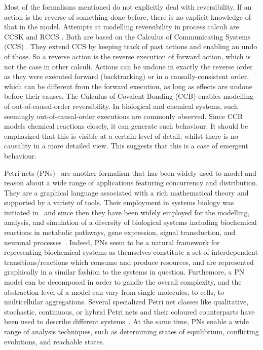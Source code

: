 \documentclass[runningheads]{llncs}
\begin{document}
Most of the formalisms mentioned do not explicitly deal with reversibility. If an action is the reverse of something done before, there is no explicit knowledge of that in the model. Attempts at modelling reversibility in process calculi are CCSK \cite{Irek2007} and RCCS \cite{danos2004ccsr}. Both are based on the Calculus of Communicating Systems (CCS) \cite{MilnerBook}. They extend CCS by keeping track of past actions and enabling an undo of those. So a reverse action is the reverse execution of forward action, which is not the case in other calculi. Actions can be undone in exactly the reverse order as they were executed forward (backtracking) or in a causally-consistent order, which can be different from the forward execution, as long as effects are undone before their causes. The Calculus of Covalent Bonding (CCB) \cite{KUHN201818} enables modelling of out-of-causal-order reversibility. In biological and chemical systems, such seemingly out-of-causal-order executions are commonly observed. Since CCB models chemical reactions closely, it can generate such behaviour. It should be emphasized that this is visible at a certain level of detail, whilst there is no causality in a more detailed view. This suggests that this is a case of emergent behaviour.

Petri nets (PNs)~\cite{PNs} are another formalism that has been widely used to model and reason
about a wide range of applications featuring concurrency and distribution. They are a graphical 
language  associated with 
a rich mathematical theory and supported by a variety of tools. Their employment in systems 
biology was initiated in~\cite{DBLP:conf/ismb/ReddyML93,DBLP:journals/jsamas/HofestadtH94}
and since then they have been widely employed for
the modelling, analysis, and simulation of a diversity of biological systems including 
biochemical reactions in metabolic pathways, gene expression, signal transduction, and neuronal processes~\cite{PNbiology,DBLP:journals/bib/Chaouiya07,DBLP:journals/nc/BaldanCMS10}. Indeed, PNs seem to be a natural framework for representing biochemical systems as themselves constitute a set of interdependent
transitions/reactions which consume 
and produce resources, and are represented graphically in a similar fashion to the systems
in question. Furthemore, a PN model
can be decomposed in order to gandle the overall complexity, and the abstraction level of a model
can vary from single molecules, to cells, to multicellular aggregations.
Several specialized Petri net classes like qualitative, stochastic, continuous, or
hybrid Petri nets and their coloured counterparts have been used to describe different
systems~\cite{DBLP:journals/jamia/PelegRA05,DBLP:journals/isb/HofestadtT98,DBLP:journals/fuin/Popova-ZeugmannHK05,DBLP:journals/nc/MatsunoNM11,DBLP:journals/isb/VossHK03}.
At the same time, PNs enable a wide range of analysis techniques, 
such as determining states of equilibrium, conflicting evolutions, 
and reachable states. 
\end{document}

